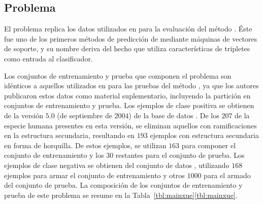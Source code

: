 %
%
\subsection{Problema \tripletsvm}
%
El problema \prob{\tripletsvm} replica los datos utilizados en
\cite{xue} para la evaluación del método \work{\tripletsvm}.
Éste fue uno de los primeros métodos de predicción de 
mediante máquinas de vectores de soporte, y su nombre deriva del hecho
que utiliza características de tripletes como entrada al clasificador.

Los conjuntos de entrenamiento y prueba que componen el problema
\prob{\tripletsvm} son idénticos a aquellos utilizados en \cite{xue}
para las pruebas del método \work{\tripletsvm}, ya que los autores
publicaron estos datos como material suplementario, incluyendo la
partición en conjuntos de entrenamiento y prueba.
Los ejemplos de clase positiva se obtienen de la versión $5$.$0$
(de septiembre de $2004$) de la base de datos \dset\mirbase.
De los $207$  de la especie humana presentes en esta
versión, se eliminan aquellos con ramificaciones en la estructura
secundaria, resultando en $193$ ejemplos con estructura secundaria en
forma de horquilla.
De estos ejemplos, se utilizan $163$ para componer el conjunto de
entrenamiento y los $30$ restantes para el conjunto de prueba.
Los ejemplos de clase negativa se obtienen del conjunto de datos
, utilizando $168$ ejemplos para armar el conjunto de
entrenamiento y otros $1000$ para el armado del conjunto de prueba.
La composición de los conjuntos de entrenamiento y prueba de este
problema se resume en la
\iflatexml{}Tabla~\ref{tbl:mainxue}\else\autoref{tbl:mainxue}\fi.
